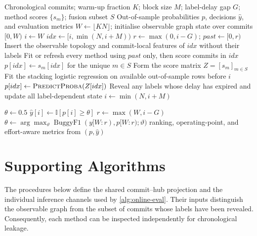 \documentclass[final,5p,times,twocolumn]{elsarticle}
\theoremstyle{plain}
\begin{document}
\begin{algorithm}[!htbp]
\caption{Leakage-free prequential evaluation, delayed labels, and fusion}
\label{alg:online-eval}
\small
\begin{algorithmic}[1]
\Require Chronological commits; warm-up fraction $K$; block size $M$; label-delay gap $G$;
  method scores $\{s_m\}$; fusion subset $S$
\Ensure Out-of-sample probabilities $p$, decisions $\hat y$, and evaluation metrics
\State $W\gets\lfloor KN\rfloor$; initialise observable graph state over commits $[0,W)$
\State $i\gets W$
  \State $idx\gets[i,\min(N,i+M))$
  \State $r\gets\max(0,i-G)$; $past\gets[0,r)$
  \State Insert the observable topology and commit-local features of $idx$ without their labels
  \State Fit or refresh every method using $past$ only, then score commits in $idx$
    \State $p[idx]\gets s_m[idx]$ for the unique $m\in S$
  \Else
    \State Form the score matrix $Z=[s_m]_{m\in S}$
    \State Fit the stacking logistic regression on available out-of-sample rows before $i$
    \State $p[idx]\gets\Call{PredictProba}{Z[idx]}$
  \EndIf
  \State Reveal any labels whose delay has expired and update all label-dependent state
  \State $i\gets\min(N,i+M)$
\EndWhile

\State $\theta\gets0.5$
  \State $\hat y[i]\gets\mathbb{I}[p[i]\ge\theta]$
    \State $r\gets\max(W,i-G)$
    \State $\theta\gets\arg\max_{\vartheta}\operatorname{BuggyF1}(y[W:r),p[W:r);\vartheta)$
  \EndIf
\EndFor
\State \Return ranking, operating-point, and effort-aware metrics from $(p,\hat y)$
\end{algorithmic}
\end{algorithm}

\FloatBarrier
\section{Supporting Algorithms}
\label{app:supporting-algorithms}

The procedures below define the shared commit--hub projection and the individual
inference channels used by \autoref{alg:online-eval}. Their inputs distinguish the
observable graph from the subset of commits whose labels have been revealed.
Consequently, each method can be inspected independently for chronological
leakage.
\end{document}
